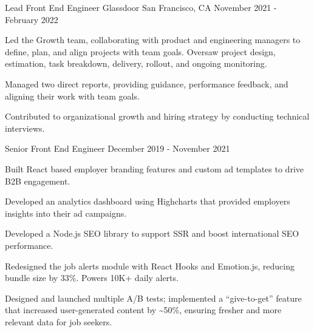 \begin{cventries}
  \cventry
    {Lead Front End Engineer} %
    {Glassdoor} %
    {San Francisco, CA} %
    {November 2021 - February 2022} %
    {
      \begin{cvitems} %
        \item {Led the Growth team, collaborating with product and engineering managers to define, plan, and align projects with team goals. Oversaw project design, estimation, task breakdown, delivery, rollout, and ongoing monitoring.}
        \item {Managed two direct reports, providing guidance, performance feedback, and aligning their work with team goals.}
        \item {Contributed to organizational growth and hiring strategy by conducting technical interviews.}
      \end{cvitems}
    }

  \cventry
    {Senior Front End Engineer} %
    { } %
    { } %
    {December 2019 - November 2021} %
    {
      \begin{cvitems} %
        \item {Built React based employer branding features and custom ad templates to drive B2B engagement.}
        \item {Developed an analytics dashboard using Highcharts that provided employers insights into their ad campaigns.}
        \item {Developed a Node.js SEO library to support SSR and boost international SEO performance.}
        \item {Redesigned the job alerts module with React Hooks and Emotion.js, reducing bundle size by 33\%. Powers 10K+ daily alerts.}
        \item {Designed and launched multiple A/B tests; implemented a ``give-to-get'' feature that increased user-generated content by \textasciitilde50\%, ensuring fresher and more relevant data for job seekers.}
      \end{cvitems}
    }



\end{cventries}

